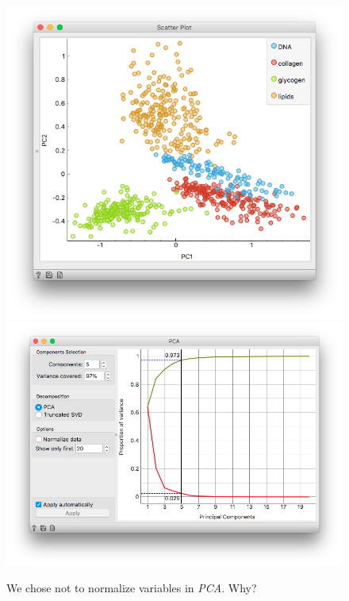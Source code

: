 \begin{figure}[h]
\hspace{-1cm}
  {\includegraphics[scale=0.4]{graphics/ch-spectral_PCA/scatterplot.png}}
  {\includegraphics[scale=0.4]{graphics/ch-spectral_PCA/pca.png}}
  \caption{We chose not to normalize variables in \textit{PCA}. Why?}
  \label{fig:spectral-PCA-fig2}
\end{figure}

